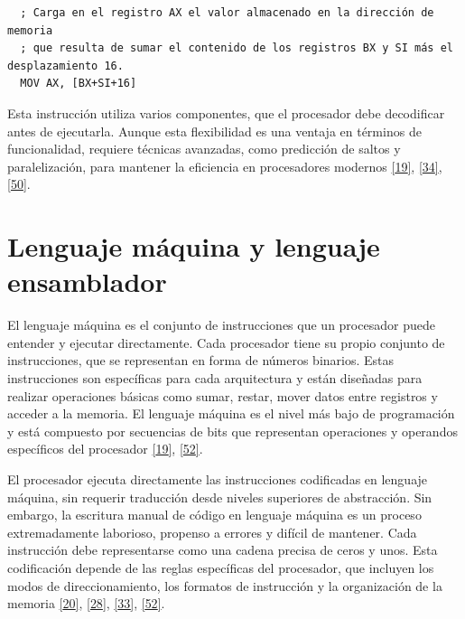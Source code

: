 \documentclass[12pt,oneside]{templates/unerthesis}
\begin{document}
\begin{lstlisting}
  ; Carga en el registro AX el valor almacenado en la dirección de memoria
  ; que resulta de sumar el contenido de los registros BX y SI más el desplazamiento 16.
  MOV AX, [BX+SI+16]
  \end{lstlisting}

Esta instrucción utiliza varios componentes, que el procesador debe decodificar antes de ejecutarla. Aunque esta flexibilidad es una ventaja en términos de funcionalidad, requiere técnicas avanzadas, como predicción de saltos y paralelización, para mantener la eficiencia en procesadores modernos \protect\hyperlink{ref-hennessy2017computer}{{[}19{]}}, \protect\hyperlink{ref-patterson_computer_2014}{{[}34{]}}, \protect\hyperlink{ref-brey_intel_microprocessors}{{[}50{]}}.

\hypertarget{lenguaje-muxe1quina-y-lenguaje-ensamblador}{%
\section{Lenguaje máquina y lenguaje ensamblador}\label{lenguaje-muxe1quina-y-lenguaje-ensamblador}}

El lenguaje máquina es el conjunto de instrucciones que un procesador puede entender y ejecutar directamente. Cada procesador tiene su propio conjunto de instrucciones, que se representan en forma de números binarios. Estas instrucciones son específicas para cada arquitectura y están diseñadas para realizar operaciones básicas como sumar, restar, mover datos entre registros y acceder a la memoria. El lenguaje máquina es el nivel más bajo de programación y está compuesto por secuencias de bits que representan operaciones y operandos específicos del procesador
\protect\hyperlink{ref-hennessy2017computer}{{[}19{]}}, \protect\hyperlink{ref-irvine2011assembly}{{[}52{]}}.

El procesador ejecuta directamente las instrucciones codificadas en lenguaje máquina, sin requerir traducción desde niveles superiores de abstracción. Sin embargo, la escritura manual de código en lenguaje máquina es un proceso extremadamente laborioso, propenso a errores y difícil de mantener. Cada instrucción debe representarse como una cadena precisa de ceros y unos. Esta codificación depende de las reglas específicas del procesador, que incluyen los modos de direccionamiento, los formatos de instrucción y la organización de la memoria \protect\hyperlink{ref-stallings_computer_2021}{{[}20{]}}, \protect\hyperlink{ref-tanenbaum_structured_2016}{{[}28{]}}, \protect\hyperlink{ref-null_essentials_2023}{{[}33{]}}, \protect\hyperlink{ref-irvine2011assembly}{{[}52{]}}.
\end{document}
